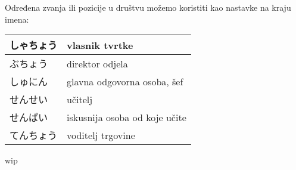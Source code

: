 	\vspace{10pt}	
	
	
	Određena zvanja ili pozicije u društvu možemo koristiti kao nastavke na kraju imena:
	
	\vspace{10pt}
	
	\begin{tabular}{|l|l|}
		\hline
		しゃちょう&vlasnik tvrtke\\\hline
		ぶちょう&direktor odjela\\\hline
		しゅにん&glavna odgovorna osoba, šef\\\hline
		せんせい&učitelj\\\hline
		せんぱい&iskusnija osoba od koje učite\\\hline
		てんちょう&voditelj trgovine\\\hline
	\end{tabular}
	
	
	
	\begin{reibun}
	\end{reibun}

wip
	
